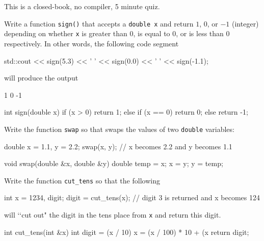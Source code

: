 

This is a closed-book, no compiler, 5 minute quiz.

\nextq
Write a function \verb!sign()! that accepts a \verb!double x! and return
$1$, $0$, or $-1$ (integer) depending on whether \verb!x! is greater than $0$, is equal to $0$, or is less than $0$ respectively. In other words, the following code segment
\begin{console}[fontsize=\footnotesize]
std::cout << sign(5.3) << ' ' << sign(0.0) << ' ' << sign(-1.1);
\end{console}
will produce the output
\begin{console}[fontsize=\footnotesize]
1 0 -1
\end{console}
\ANSWER
\begin{answercode}
int sign(double x)
{
    if (x > 0)
        return 1;
    else if (x == 0)
        return 0;
    else
        return -1;
}
\end{answercode}

\nextq
Write the function \verb!swap! so that swaps the values of two
\verb!double! variables:
\begin{console}[fontsize=\small]
double x = 1.1, y = 2.2;
swap(x, y);     // x becomes 2.2 and y becomes 1.1
\end{console}
\ANSWER
\begin{answercode}
void swap(double &x, double &y)
{
    double temp = x;
    x = y;
    y = temp;
}
\end{answercode}

\nextq
Write the function \verb!cut_tens! so that the following
\begin{console}[fontsize=\small]
int x = 1234, digit;
digit = cut_tens(x); // digit 3 is returned and x becomes 124
\end{console}
will \lq\lq cut out" the digit in the tens place from \verb!x! and
return this digit.
\\
\ANSWER
\begin{answercode}
int cut_tens(int &x)
{
    int digit = (x / 10) %
    x = (x / 100) * 10 + (x %
    return digit;
}
\end{answercode}


